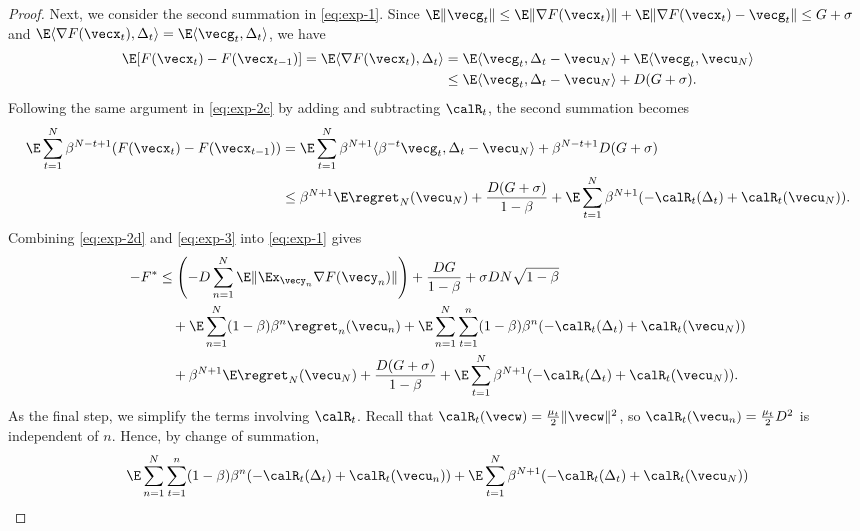 \begin{proof}
Next, we consider the second summation in \eqref{eq:exp-1}. Since $\E\|\vecg_t\| \le \E\|\nabla F(\vecx_t)\| + \E\|\nabla F(\vecx_t)-\vecg_t\| \le G+\sigma$ and $\E\langle \nabla F(\vecx_t),\Delta_t\rangle = \E\langle \vecg_t,\Delta_t\rangle$, we have
\begin{align*}
    \E[F(\vecx_t) - F(\vecx_{t-1})]
    = \E\langle \nabla F(\vecx_t),\Delta_t\rangle 
    &= \E\langle \vecg_t, \Delta_t - \vecu_N\rangle + \E\langle \vecg_t, \vecu_N\rangle \\
    &\le \E\langle \vecg_t,\Delta_t-\vecu_N\rangle + D(G+\sigma).
\end{align*}
Following the same argument in \eqref{eq:exp-2c} by adding and subtracting $\calR_t$, the second summation becomes
\begin{align}
    \E\sum_{t=1}^N \beta^{N-t+1} (F(\vecx_t) - F(\vecx_{t-1})) 
    &= \E\sum_{t=1}^N \beta^{N+1} \langle \beta^{-t}\vecg_t,\Delta_t-\vecu_N\rangle + \beta^{N-t+1} D(G+\sigma) \notag\\
    &\le \beta^{N+1} \E\regret_N(\vecu_N) + \frac{D(G+\sigma)}{1-\beta} + \E\sum_{t=1}^N \beta^{N+1} (-\calR_t(\Delta_t) + \calR_t(\vecu_N)).
    \label{eq:exp-3}
\end{align}
Combining \eqref{eq:exp-2d} and \eqref{eq:exp-3} into \eqref{eq:exp-1} gives
\begin{align}
    -F^*
    &\le \left(-D\sum_{n=1}^N \E \|\Ex_{\vecy_n} \nabla F(\vecy_n)\| \right) + \frac{DG}{1-\beta} + \sigma DN\sqrt{1-\beta} \notag\\
    &\quad + \E\sum_{n=1}^N (1-\beta)\beta^n \regret_n(\vecu_n) + \E\sum_{n=1}^N\sum_{t=1}^n (1-\beta)\beta^n ( -\calR_t(\Delta_t) + \calR_t(\vecu_N)) \notag\\
    &\quad + \beta^{N+1} \E\regret_N(\vecu_N) + \frac{D(G+\sigma)}{1-\beta} + \E\sum_{t=1}^N \beta^{N+1} (-\calR_t(\Delta_t) + \calR_t(\vecu_N)).
    \label{eq:exp-4}
\end{align}
As the final step, we simplify the terms involving $\calR_t$. 
Recall that $\calR_t(\vecw) = \frac{\mu_t}{2}\|\vecw\|^2$, so $\calR_t(\vecu_n)=\frac{\mu_t}{2}D^2$ is independent of $n$. Hence, by change of summation,
\begin{align*}
    &\E\sum_{n=1}^N\sum_{t=1}^n (1-\beta)\beta^n ( -\calR_t(\Delta_t) + \calR_t(\vecu_n)) + \E\sum_{t=1}^N \beta^{N+1} (-\calR_t(\Delta_t) + \calR_t(\vecu_N)) \\

\end{align*}
\end{proof}
